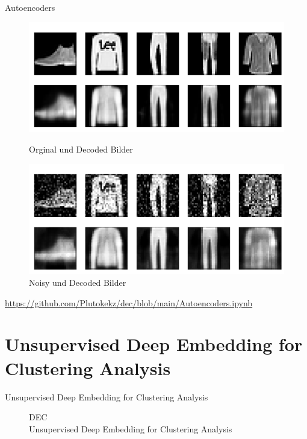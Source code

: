 \documentclass{beamer}
\begin{document}
\begin{frame}[t]{Autoencoders}\vspace{4pt}
\begin{figure}
\center
\includegraphics[scale=0.315]{AutoencoderResult.png}
{\fontsize{5}{6}\selectfont \caption{Orginal und Decoded Bilder}}
\includegraphics[scale=0.315]{DenosingAutoencoderResult.png}
{\fontsize{5}{6}\selectfont \caption{Noisy und Decoded Bilder}}
\end{figure}
\tiny{\url{https://github.com/Plutokekz/dec/blob/main/Autoencoders.ipynb}}
\end{frame}
\section{Unsupervised Deep Embedding for Clustering Analysis}
\begin{frame}[t]{Unsupervised Deep Embedding for Clustering Analysis}\vspace{45pt}
\begin{figure}
\center
\Huge{DEC}
\\
\vspace{10pt}
\Large{Unsupervised Deep Embedding for Clustering Analysis}

\end{figure}

\end{frame}
\end{document}
